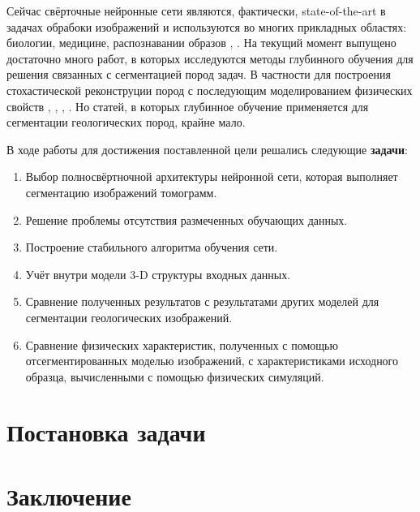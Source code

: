 \documentclass[14pt, a4paper, oneside, bold]{extarticle}
\begin{document}
Сейчас свёрточные нейронные сети являются, фактически, state-of-the-art в задачах обрабоки изображений \cite{6} и используются во многих прикладных областях: биологии, медицине, распознавании образов \cite{11}, \cite{12}. На текущий момент выпущено достаточно много работ, в которых исследуются методы глубинного обучения для решения связанных с сегментацией пород задач. В частности для  построения стохастической реконструции пород с последующим моделированием физических свойств \cite{7}, \cite{8}, \cite{9}, \cite{10}. Но статей, в которых глубинное обучение применяется для сегментации геологических пород, крайне мало. 

В ходе работы для достижения поставленной цели решались следующие 
\textbf{задачи}:
\begin{enumerate}
	\item Выбор полносвёртночной архитектуры нейронной сети, 
	которая выполняет сегментацию изображений томограмм.
	\item Решение проблемы отсутствия размеченных обучающих данных.
	\item Построение стабильного алгоритма обучения сети.
	\item Учёт внутри модели 3-D структуры входных данных.
	\item Сравнение полученных результатов с результатами других 			моделей для сегментации геологических изображений.
	\item Сравнение физических характеристик, полученных с помощью 
	отсегментированных моделью изображений, с характеристиками 				исходного образца, вычисленными с помощью физических симуляций.
\end{enumerate}
  
\newpage

\section{Постановка задачи}

\section{Заключение}
\end{document}
